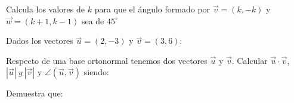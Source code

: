\documentclass[addpoints,spanish, 12pt,a4paper]{exam}
\begin{document}
        \begin{questions}
        
        
        
        \question[2] Calcula los valores de $k$ para que el ángulo formado por $\overrightarrow{v}=\left(k, -k\right)$ y $\overrightarrow{w}=\left(k+1, k-1\right)$ sea de $45^\circ$
   
        \question Dados los vectores $\overrightarrow{u}=\left(2, -3\right)$ y $\overrightarrow{v}=\left(3, 6\right)$:
        \question Respecto de una base ortonormal tenemos dos vectores $\overrightarrow{u}$ y $\overrightarrow{v}$.
Calcular $\overrightarrow{u}\cdot\overrightarrow{v}$, $|\overrightarrow{u}| \ y \ |\overrightarrow{v}|$ 
y $\angle(\overrightarrow{u},\overrightarrow{v})$ siendo:
        \begin{multicols}{1} 
        \end{multicols}
        
        
        \question Demuestra que:
        \begin{parts}

\end{parts}
\end{questions}
\end{document}
